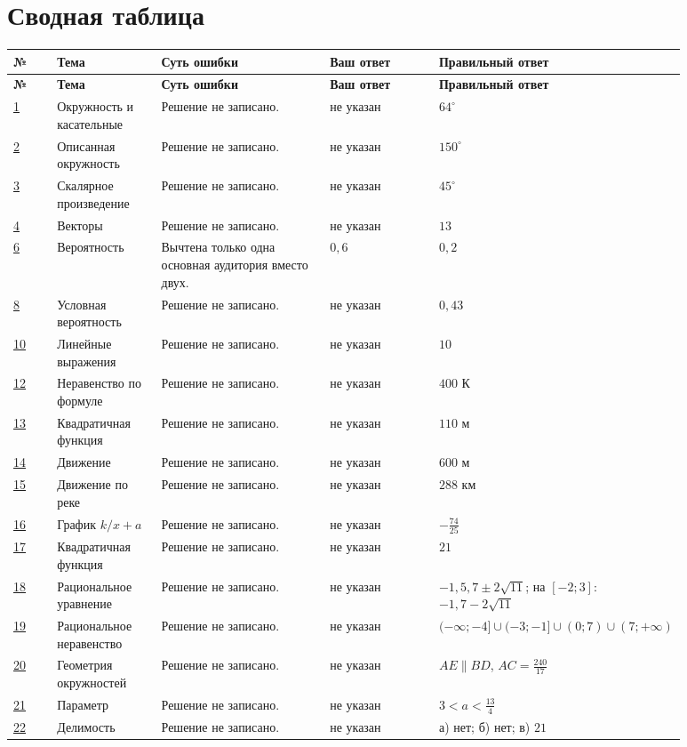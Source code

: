 \documentclass[12pt,a4paper]{article}
\begin{document}
\section*{Сводная таблица}
\small
\setlength{\tabcolsep}{3.5pt}
\begin{longtable}{>{\centering\arraybackslash}p{0.07\linewidth} p{0.16\linewidth} p{0.29\linewidth} p{0.18\linewidth} p{0.18\linewidth}}
\toprule
\textbf{№} & \textbf{Тема} & \textbf{Суть ошибки} & \textbf{Ваш ответ} & \textbf{Правильный ответ}\\
\midrule
\endfirsthead
\toprule
\textbf{№} & \textbf{Тема} & \textbf{Суть ошибки} & \textbf{Ваш ответ} & \textbf{Правильный ответ}\\
\midrule
\endhead
\hyperref[task:1]{1} & Окружность и касательные & Решение не записано. & не указан & $64^\circ$\\
\hyperref[task:2]{2} & Описанная окружность & Решение не записано. & не указан & $150^\circ$\\
\hyperref[task:3]{3} & Скалярное произведение & Решение не записано. & не указан & $45^\circ$\\
\hyperref[task:4]{4} & Векторы & Решение не записано. & не указан & $13$\\
\hyperref[task:6]{6} & Вероятность & Вычтена только одна основная аудитория вместо двух. & $0{,}6$ & $0{,}2$\\
\hyperref[task:8]{8} & Условная вероятность & Решение не записано. & не указан & $0{,}43$\\
\hyperref[task:10]{10} & Линейные выражения & Решение не записано. & не указан & $10$\\
\hyperref[task:12]{12} & Неравенство по формуле & Решение не записано. & не указан & $400$ К\\
\hyperref[task:13]{13} & Квадратичная функция & Решение не записано. & не указан & $110$ м\\
\hyperref[task:14]{14} & Движение & Решение не записано. & не указан & $600$ м\\
\hyperref[task:15]{15} & Движение по реке & Решение не записано. & не указан & $288$ км\\
\hyperref[task:16]{16} & График $k/x+a$ & Решение не записано. & не указан & $-\frac{74}{25}$\\
\hyperref[task:17]{17} & Квадратичная функция & Решение не записано. & не указан & $21$\\
\hyperref[task:18]{18} & Рациональное уравнение & Решение не записано. & не указан & $-1,5,7\pm2\sqrt{11}$; на $[-2;3]$: $-1,7-2\sqrt{11}$\\
\hyperref[task:19]{19} & Рациональное неравенство & Решение не записано. & не указан & $(-\infty;-4]\cup(-3;-1]\cup(0;7)\cup(7;+\infty)$\\
\hyperref[task:20]{20} & Геометрия окружностей & Решение не записано. & не указан & $AE\parallel BD$, $AC=\frac{240}{17}$\\
\hyperref[task:21]{21} & Параметр & Решение не записано. & не указан & $3<a<\frac{13}{4}$\\
\hyperref[task:22]{22} & Делимость & Решение не записано. & не указан & а) нет; б) нет; в) $21$\\
\bottomrule
\end{longtable}
\end{document}
